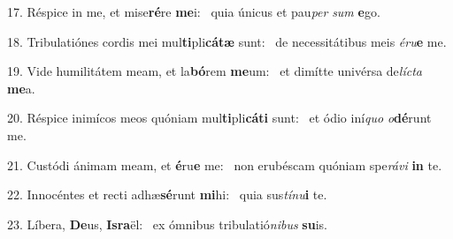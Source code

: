 17. Réspice in me, et mise\textbf{ré}re \textbf{me}i: \ast\  quia únicus et pau\textit{per} \textit{sum} \textbf{e}go.\

18. Tribulatiónes cordis mei mul\textbf{ti}pli\textbf{cá}\textbf{tæ} sunt: \ast\  de necessitátibus meis \textit{é}\textit{ru}\textbf{e} me.\

19. Vide humilitátem meam, et la\textbf{bó}rem \textbf{me}um: \ast\  et dimítte univérsa de\textit{líc}\textit{ta} \textbf{me}a.\

20. Réspice inimícos meos quóniam mul\textbf{ti}pli\textbf{cá}\textbf{ti} sunt: \ast\  et ódio iní\textit{quo} \textit{o}\textbf{dé}runt me.\

21. Custódi ánimam meam, et \textbf{é}ru\textbf{e} me: \ast\  non erubéscam quóniam spe\textit{rá}\textit{vi} \textbf{in} te.\

22. Innocéntes et recti adhæ\textbf{sé}runt \textbf{mi}hi: \ast\  quia sus\textit{tí}\textit{nu}\textbf{i} te.\

23. Líbera, \textbf{De}us, \textbf{Is}\textbf{ra}ël: \ast\  ex ómnibus tribulatió\textit{ni}\textit{bus} \textbf{su}is.\

